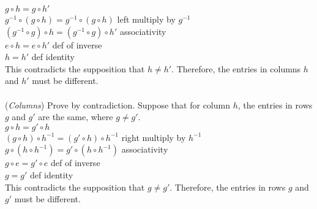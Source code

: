 \noindent
$g \circ h = g \circ h'$\\
$g^{-1} \circ (g \circ h) = g^{-1} \circ (g \circ h)$ \quad left multiply by $g^{-1}$\\
$(g^{-1} \circ g) \circ h = (g^{-1} \circ g) \circ h'$ \quad associativity\\
$e \circ h = e \circ h'$ \quad def of inverse\\
$h = h'$ \quad def identity\\

\noindent
This contradicts the supposition that $h \neq h'$.  Therefore, the entries in columns $h$ and $h'$ must be different.\\
\\
(\emph{Columns}) Prove by contradiction. Suppose that for column $h$,  the entries in rows $g$ and $g'$ are the same, where $g \neq g'$.\\

\noindent
$g \circ h = g' \circ h$\\
$(g \circ h) \circ h^{-1} = (g' \circ h) \circ h^{-1}$ \quad right multiply by $h^{-1}$\\
$g \circ (h \circ h^{-1}) = g' \circ (h \circ h^{-1})$ \quad associativity\\
$g \circ e = g' \circ e$ \quad def of inverse\\
$g = g'$ \quad def identity\\

\noindent
This contradicts the supposition that $g \neq g'$.  Therefore, the entries in rows $g$ and $g'$ must be different.\\
\\

